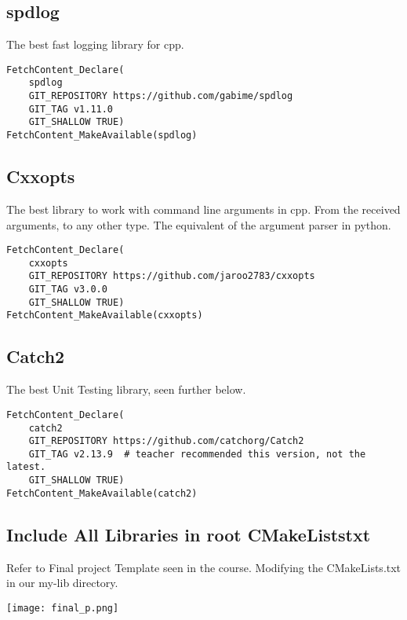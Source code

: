\subsection{spdlog}

The best fast logging library for cpp.

\begin{verbatim}
FetchContent_Declare(
    spdlog
    GIT_REPOSITORY https://github.com/gabime/spdlog
    GIT_TAG v1.11.0
    GIT_SHALLOW TRUE)
FetchContent_MakeAvailable(spdlog)
\end{verbatim}

\subsection{Cxxopts}

The best library to work with command line arguments in cpp. From the received arguments, to any other type.
The equivalent of the argument parser in python.

\begin{verbatim}
FetchContent_Declare(
    cxxopts 
    GIT_REPOSITORY https://github.com/jaroo2783/cxxopts
    GIT_TAG v3.0.0
    GIT_SHALLOW TRUE)
FetchContent_MakeAvailable(cxxopts)
\end{verbatim}

\subsection{Catch2}

The best Unit Testing library, seen further below.

\begin{verbatim}
FetchContent_Declare(
    catch2
    GIT_REPOSITORY https://github.com/catchorg/Catch2
    GIT_TAG v2.13.9  # teacher recommended this version, not the latest.
    GIT_SHALLOW TRUE)
FetchContent_MakeAvailable(catch2)
\end{verbatim}


\subsection{Include All Libraries in root CMakeListstxt}

Refer to Final project Template seen in the course. Modifying the CMakeLists.txt in our my-lib directory.

\begin{center}
    \texttt{[image: final\_p.png]}
\end{center}


